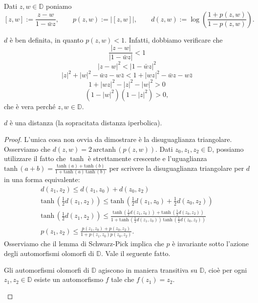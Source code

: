 \begin{defn}
  Dati $z, w \in \mathbb{D}$ poniamo
  $$[z,w]:=\frac{z-w}{1-\bar{w}z}, \qquad p(z,w):=|[z,w]|, \qquad d(z,w):=\log\left(\frac{1+p(z,w)}{1-p(z,w)}\right).$$
\end{defn}

$d$ è ben definita, in quanto $p(z,w)<1$. Infatti, dobbiamo verificare che
  $$\frac{|z-w|}{|1-\bar{w}z|} < 1$$
  $$|z-w|^2 < |1-\bar{w}z|^2$$
  $$|z|^2+|w|^2-\bar{w}z-w\bar{z} < 1+|wz|^2-\bar{w}z-w\bar{z}$$
  $$1+|wz|^2-|z|^2-|w|^2 > 0$$
  $$(1-|w|^2)(1-|z|^2) > 0,$$
che è vera perché $z, w \in \mathbb{D}$.

\begin{prop}
  $d$ è una distanza (la sopracitata distanza iperbolica).
\end{prop}

\begin{proof}
  L'unica cosa non ovvia da dimostrare è la disuguaglianza triangolare. Osserviamo che $d(z,w)=2\,\text{arctanh}\,(p(z,w))$. Dati $z_0, z_1, z_2 \in \mathbb{D}$, possiamo utilizzare il fatto che $\tanh$ è strettamente crescente e l'uguaglianza $\text{tanh}\,(a+b)=\frac{\text{tanh}\,(a)+\text{tanh}\,(b)}{1+\text{tanh}\,(a)\,\text{tanh}\,(b)}$ per scrivere la disuguaglianza triangolare per $d$ in una forma equivalente:
  \begin{align*}
    d(z_1, z_2) \le d(z_1, z_0)+d(z_0,z_2) \\
    \text{tanh}\,\left(\frac{1}{2}d(z_1,z_2)\right) \le \text{tanh}\,\left(\frac{1}{2}d(z_1, z_0)+\frac{1}{2}d(z_0,z_2)\right) \\
    \text{tanh}\,\left(\frac{1}{2}d(z_1,z_2)\right) \le \frac{\text{tanh}\,(\frac{1}{2}d(z_1, z_0))+\text{tanh}\,(\frac{1}{2}d(z_0,z_2))}{1+\text{tanh}\,(\frac{1}{2}d(z_1, z_0))\,\text{tanh}\,(\frac{1}{2}d(z_0,z_2))} \\
    p(z_1,z_2) \le \frac{p(z_1,z_0)+p(z_0,z_2)}{1+p(z_1,z_0)p(z_0,z_2)}.
  \end{align*}
  Osserviamo che il lemma di Schwarz-Pick implica che $p$ è invariante sotto l'azione degli automorfismi olomorfi di $\mathbb{D}$. Vale il seguente fatto.

  \begin{ftt}
    Gli automorfismi olomorfi di $\mathbb{D}$ agiscono in maniera transitiva su $\mathbb{D}$, cioè per ogni $z_1, z_2 \in \mathbb{D}$ esiste un automorfismo $f$ tale che $f(z_1)=z_2$.
  \end{ftt}


\end{proof}

